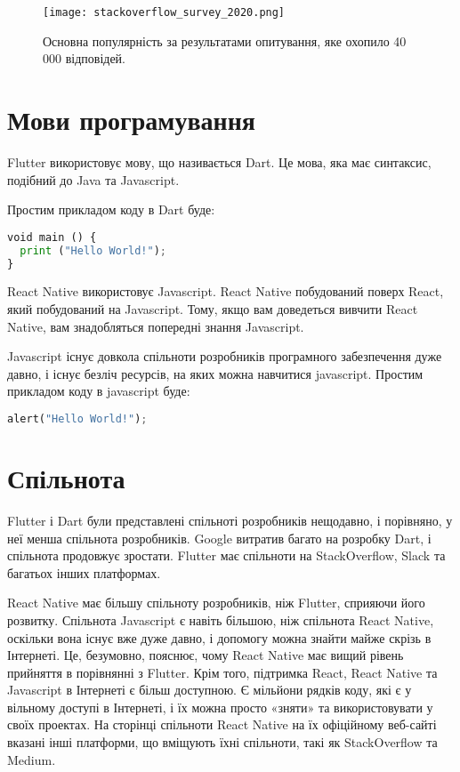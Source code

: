 \begin{figure}
    \label{fig:stackoverflow_survey_2020}
    \begin{center}
        \texttt{[image: stackoverflow\_survey\_2020.png]}
    \end{center}

    Основна популярність за результатами опитування, яке охопило 40 000 відповідей.
    \cite{stackoverflow_survey_2020}
\end{figure}

\section{Мови програмування}\label{section.1.4}

Flutter використовує мову, що називається Dart.
Це мова, яка має синтаксис, подібний до Java та Javascript.

Простим прикладом коду в Dart буде:
\begin{lstlisting}[style=light, language=Python,label={lst:vectorimg},caption=Dart Hello World]
void main () { 
  print ("Hello World!"); 
}
\end{lstlisting}

React Native використовує Javascript.
React Native побудований поверх React, який побудований на Javascript.
Тому, якщо вам доведеться вивчити React Native, вам знадобляться попередні знання Javascript.

Javascript існує довкола спільноти розробників програмного забезпечення дуже давно, і існує безліч ресурсів, на яких можна навчитися javascript.
Простим прикладом коду в javascript буде:

\begin{lstlisting}[style=light, language=Python,label={lst:vectorimg},caption=Dart Hello World]
  alert("Hello World!");
\end{lstlisting}


\section{Спільнота}\label{section.1.5}

Flutter і Dart були представлені спільноті розробників нещодавно, і порівняно, у неї менша спільнота розробників.
Google витратив багато на розробку Dart, і спільнота продовжує зростати.
Flutter має спільноти на StackOverflow, Slack та багатьох інших платформах.

React Native має більшу спільноту розробників, ніж Flutter, сприяючи його розвитку.
Спільнота Javascript є навіть більшою, ніж спільнота React Native, оскільки вона існує вже дуже давно, і допомогу можна знайти майже скрізь в Інтернеті.
Це, безумовно, пояснює, чому React Native має вищий рівень прийняття в порівнянні з Flutter.
Крім того, підтримка React, React Native та Javascript в Інтернеті є більш доступною.
Є мільйони рядків коду, які є у вільному доступі в Інтернеті, і їх можна просто «зняти» та використовувати у своїх проектах.
На сторінці спільноти React Native на їх офіційному веб-сайті вказані інші платформи, що вміщують їхні спільноти, такі як StackOverflow та Medium.


